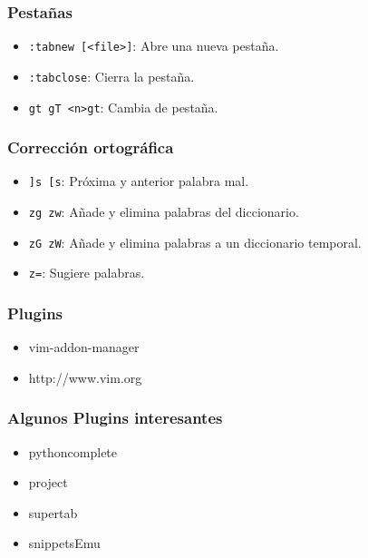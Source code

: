 \documentclass[10pt]{beamer}
\begin{document}
  \begin{frame}[containsverbatim]
    \frametitle{Pestañas}
    \begin{itemize}
      \item \verb+:tabnew [<file>]+: Abre una nueva pestaña.
      \item \verb+:tabclose+: Cierra la pestaña.
      \item \verb+gt gT <n>gt+: Cambia de pestaña.
    \end{itemize}
  \end{frame}

  \begin{frame}[containsverbatim]
    \frametitle{Corrección ortográfica}
    \begin{itemize}
      \item \verb+]s [s+: Próxima y anterior palabra mal.
      \item \verb+zg zw+: Añade y elimina palabras del diccionario.
      \item \verb+zG zW+: Añade y elimina palabras a un diccionario temporal.
      \item \verb+z=+: Sugiere palabras.
    \end{itemize}
  \end{frame}
  
  \begin{frame}[containsverbatim]
    \frametitle{Plugins}
    \begin{itemize}
      \item vim-addon-manager
      \item http://www.vim.org
    \end{itemize}
  \end{frame}

  \begin{frame}[containsverbatim]
    \frametitle{Algunos Plugins interesantes}
    \begin{itemize}
      \item pythoncomplete
      \item project
      \item supertab
      \item snippetsEmu
    \end{itemize}
  \end{frame}
  
  
\end{document}
